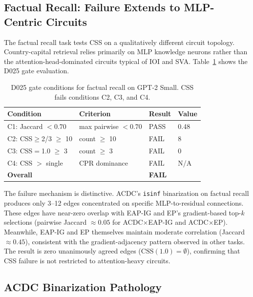 \documentclass[11pt,a4paper]{article}
\begin{document}
\subsection{Factual Recall: Failure Extends to MLP-Centric Circuits}
\label{sec:factual}

The factual recall task tests CSS on a qualitatively different circuit topology. Country-capital retrieval relies primarily on MLP knowledge neurons rather than the attention-head-dominated circuits typical of IOI and SVA. Table~\ref{tab:factual_gate} shows the D025 gate evaluation.

\begin{table}[t]
\centering
\small
\caption{D025 gate conditions for factual recall on GPT-2 Small. CSS fails conditions C2, C3, and C4.}
\label{tab:factual_gate}
\begin{tabular}{llll}
\toprule
\textbf{Condition} & \textbf{Criterion} & \textbf{Result} & \textbf{Value} \\
\midrule
C1: Jaccard $< 0.70$ & max pairwise $< 0.70$ & PASS & 0.48 \\
C2: CSS$\geq$2/3 $\geq$ 10 & count $\geq$ 10 & FAIL & 8 \\
C3: CSS$=$1.0 $\geq$ 3 & count $\geq$ 3 & FAIL & 0 \\
C4: CSS $>$ single & CPR dominance & FAIL & N/A \\
\midrule
\textbf{Overall} & & \textbf{FAIL} & \\
\bottomrule
\end{tabular}
\end{table}

The failure mechanism is distinctive. ACDC's \texttt{isinf} binarization on factual recall produces only 3--12 edges concentrated on specific MLP-to-residual connections. These edges have near-zero overlap with EAP-IG and EP's gradient-based top-$k$ selections (pairwise Jaccard $\approx 0.05$ for ACDC$\times$EAP-IG and ACDC$\times$EP). Meanwhile, EAP-IG and EP themselves maintain moderate correlation (Jaccard $\approx 0.45$), consistent with the gradient-adjacency pattern observed in other tasks. The result is zero unanimously agreed edges ($\text{CSS}(1.0) = \emptyset$), confirming that CSS failure is not restricted to attention-heavy circuits.

\subsection{ACDC Binarization Pathology}
\label{sec:binarization}
\end{document}
